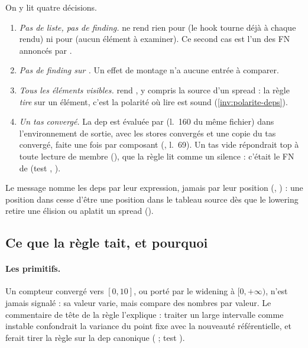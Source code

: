 On y lit quatre décisions.
\begin{enumerate}
  \item \emph{Pas de liste, pas de finding.}  ne rend rien pour  (le hook tourne déjà à chaque rendu) ni pour  (aucun élément à examiner). Ce second cas est l'un des FN annoncés par .
  \item \emph{Pas de finding sur \code{[]}.} Un effet de montage n'a aucune entrée à comparer.
  \item \emph{Tous les éléments visibles.}  rend , y compris la source d'un spread : la règle \emph{tire} sur un élément, c'est la polarité où lire  est sound (\cref{inv:polarite-deps}).
  \item \emph{Un tas convergé.} La dep est évaluée par  (l.~160 du même fichier) dans l'environnement de sortie, avec les stores convergés et une copie du tas convergé, faite une fois par composant (, l.~69). Un tas vide répondrait top à toute lecture de membre (), que la règle lit comme un silence : c'était le FN de  (test , ).
\end{enumerate}

Le message nomme les deps par leur expression, jamais par leur position (, ) : une position dans  cesse d'être une position dans le tableau source dès que le lowering retire une élision ou aplatit un spread ().

\subsection{Ce que la règle tait, et pourquoi}

\paragraph{Les primitifs.} Un compteur convergé vers $[0, 10]$, ou porté par le widening à $[0, +\infty)$, n'est jamais signalé : sa valeur varie, mais  compare des nombres par valeur. Le commentaire de tête de la règle l'explique : traiter un large intervalle comme instable confondrait la variance du point fixe avec la nouveauté référentielle, et ferait tirer la règle sur la dep canonique \code{[count]} ( ; test ).

